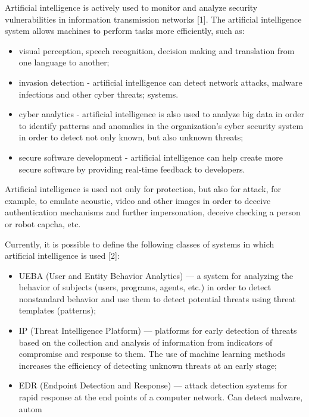 \documentclass{article}
\begin{document}
\begin{multicols}{2}
Artificial intelligence is actively used to monitor and
analyze security vulnerabilities in information transmission networks [1]. The artificial intelligence system allows
machines to perform tasks more efficiently, such as: 
\begin{itemize}[noitemsep]
    \item visual perception, speech recognition, decision making and translation from one language to another;
    \item invasion detection - artificial intelligence can detect
network attacks, malware infections and other cyber
threats;
systems.
     \item cyber analytics - artificial intelligence is also used
to analyze big data in order to identify patterns and
anomalies in the organization’s cyber security system
in order to detect not only known, but also unknown
threats;
    \item secure software development - artificial intelligence
can help create more secure software by providing
real-time feedback to developers.

\end{itemize}
Artificial intelligence is used not only for protection,
but also for attack, for example, to emulate acoustic,
video and other images in order to deceive authentication
mechanisms and further impersonation, deceive checking
a person or robot capcha, etc.

Currently, it is possible to define the following classes
of systems in which artificial intelligence is used [2]:
\begin{itemize}[noitemsep]
    \item UEBA (User and Entity Behavior Analytics) —
a system for analyzing the behavior of subjects
(users, programs, agents, etc.) in order to detect nonstandard behavior and use them to detect potential
threats using threat templates (patterns);

    \item IP (Threat Intelligence Platform) — platforms for
early detection of threats based on the collection
and analysis of information from indicators of
compromise and response to them. The use of
machine learning methods increases the efficiency
of detecting unknown threats at an early stage;

    \item EDR (Endpoint Detection and Response) — attack
detection systems for rapid response at the end
points of a computer network. Can detect malware,
autom
\end{itemize}
\end{multicols}
\end{document}
